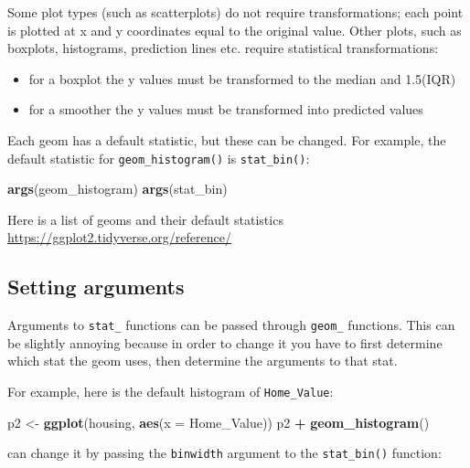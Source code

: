 \documentclass[
]{book}
\newenvironment{Shaded}{\begin{snugshade}}{\end{snugshade}}
\newcommand{\DataTypeTok}[1]{\textcolor[rgb]{0.13,0.29,0.53}{#1}}
\newcommand{\KeywordTok}[1]{\textcolor[rgb]{0.13,0.29,0.53}{\textbf{#1}}}
\newcommand{\NormalTok}[1]{#1}
\newcommand{\OperatorTok}[1]{\textcolor[rgb]{0.81,0.36,0.00}{\textbf{#1}}}
\newcommand{\StringTok}[1]{\textcolor[rgb]{0.31,0.60,0.02}{#1}}
\providecommand{\tightlist}{%
  \setlength{\itemsep}{0pt}\setlength{\parskip}{0pt}}
\begin{document}
Some plot types (such as scatterplots) do not require transformations; each point is plotted at x and y coordinates equal to the original value. Other plots, such as boxplots, histograms, prediction lines etc. require statistical transformations:

\begin{itemize}
\tightlist
\item
  for a boxplot the y values must be transformed to the median and 1.5(IQR)
\item
  for a smoother the y values must be transformed into predicted values
\end{itemize}

Each geom has a default statistic, but these can be changed. For example, the default statistic for \texttt{geom\_histogram()} is \texttt{stat\_bin()}:

\begin{Shaded}
\begin{Highlighting}[]
\KeywordTok{args}\NormalTok{(geom_histogram)}
\KeywordTok{args}\NormalTok{(stat_bin)}
\end{Highlighting}
\end{Shaded}

Here is a list of geoms and their default statistics \url{https://ggplot2.tidyverse.org/reference/}

\hypertarget{setting-arguments}{%
\subsection{Setting arguments}\label{setting-arguments}}

Arguments to \texttt{stat\_} functions can be passed through \texttt{geom\_} functions. This can be slightly annoying because in order to change it you have to first determine which stat the geom uses, then determine the arguments to that stat.

For example, here is the default histogram of \texttt{Home\_Value}:

\begin{Shaded}
\begin{Highlighting}[]
\NormalTok{p2 <-}\StringTok{ }\KeywordTok{ggplot}\NormalTok{(housing, }\KeywordTok{aes}\NormalTok{(}\DataTypeTok{x =}\NormalTok{ Home_Value))}
\NormalTok{p2 }\OperatorTok{+}\StringTok{ }\KeywordTok{geom_histogram}\NormalTok{()}
\end{Highlighting}
\end{Shaded}

can change it by passing the \texttt{binwidth} argument to the \texttt{stat\_bin()} function:
\end{document}
